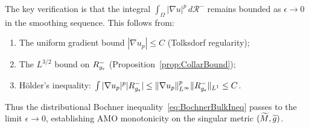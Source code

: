 The key verification is that the integral $\int_\Omega |\nabla u|^p \, d\mathcal{R}^-$ remains bounded as $\epsilon \to 0$ in the smoothing sequence. This follows from:
\begin{enumerate}
    \item The uniform gradient bound $|\nabla u_p| \le C$ (Tolksdorf regularity);
    \item The $L^{3/2}$ bound on $R_{g_{\epsilon}}^-$ (Proposition~\ref{prop:CollarBound});
    \item H\"older's inequality: $\int |\nabla u_p|^p |R_{g_{\epsilon}}^-| \le \|\nabla u_p\|_{L^\infty}^p \|R_{g_{\epsilon}}^-\|_{L^1} \le C$.
\end{enumerate}
Thus the distributional Bochner inequality~\eqref{eq:BochnerBulkIneq} passes to the limit $\epsilon \to 0$, establishing AMO monotonicity on the singular metric $(\widetilde{M}, \widetilde{g})$.

